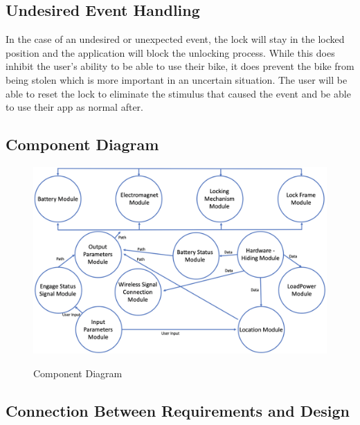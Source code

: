 \documentclass[12pt, titlepage]{article}
\begin{document}
\subsection{Undesired Event Handling}

In the case of an undesired or unexpected event, the lock will stay in the locked position and the application will block the unlocking process. While this does inhibit the user's ability to be able to use their bike, it does prevent the bike from being stolen which is more important in an uncertain situation. The user will be able to reset the lock to eliminate the stimulus that caused the event and be able to use their app as normal after.


\subsection{Component Diagram}

 \begin{figure}[h!]
 \begin{center}
 {
  \includegraphics[width=0.8\linewidth]{component diagram.png}
 }
 \caption{\label{component diagram} Component Diagram}
 \end{center}
 \end{figure}


\subsection{Connection Between Requirements and Design} %
\end{document}
